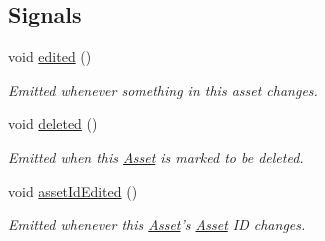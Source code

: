 \subsection*{Signals}
\begin{DoxyCompactItemize}
\item 
\hypertarget{class_picto_1_1_asset_a2ca6303bf64730a9994a180bf2227da4}{void \hyperlink{class_picto_1_1_asset_a2ca6303bf64730a9994a180bf2227da4}{edited} ()}\label{class_picto_1_1_asset_a2ca6303bf64730a9994a180bf2227da4}

\begin{DoxyCompactList}\small\item\em Emitted whenever something in this asset changes. \end{DoxyCompactList}\item 
void \hyperlink{class_picto_1_1_asset_a5a96aa71c14a5de4a24aea183660147a}{deleted} ()
\begin{DoxyCompactList}\small\item\em Emitted when this \hyperlink{class_picto_1_1_asset}{Asset} is marked to be deleted. \end{DoxyCompactList}\item 
\hypertarget{class_picto_1_1_asset_af9dc9a5935284306615aa5e19a5be49e}{void \hyperlink{class_picto_1_1_asset_af9dc9a5935284306615aa5e19a5be49e}{asset\-Id\-Edited} ()}\label{class_picto_1_1_asset_af9dc9a5935284306615aa5e19a5be49e}

\begin{DoxyCompactList}\small\item\em Emitted whenever this \hyperlink{class_picto_1_1_asset}{Asset}'s \hyperlink{class_picto_1_1_asset}{Asset} I\-D changes. \end{DoxyCompactList}\end{DoxyCompactItemize}
